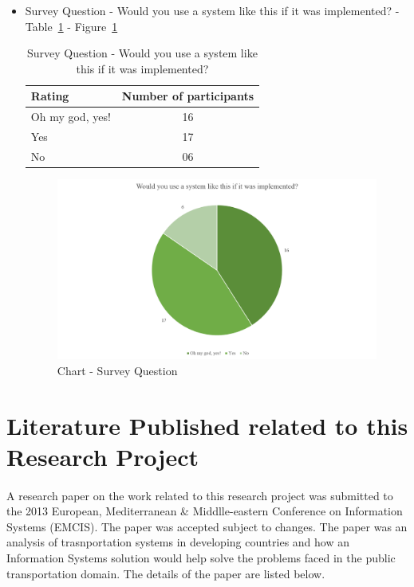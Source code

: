 \begin {itemize}
\item Survey Question - Would you use a system like this if it was implemented? - Table~\ref{table-survey-question-WouldYouUseASystemLikeThis} - Figure~\ref{image-questionWouldYouUse}

\begin{table} [H]
\centering
\begin{tabular}{|l|c|}
\hline
Rating & Number of participants \\
\hline
Oh my god, yes!	&16 \\
Yes	&17 \\
No	&06 \\
\hline
\end{tabular}
\caption{Survey Question - Would you use a system like this if it was implemented?}
\label{table-survey-question-WouldYouUseASystemLikeThis}
\end{table}

\begin {figure} [H]
\centering
\includegraphics [scale=0.7] {questionWouldYouUse}
\caption [Chart - Survey Question] {Chart - Survey Question}
\label {image-questionWouldYouUse}
\end {figure}

\end {itemize}



\section{Literature Published related to this Research Project}

\paragraph{} A research paper on the work related to this research project was submitted to the 2013 European, Mediterranean \& Middlle-eastern Conference on Information Systems (EMCIS). The paper was accepted subject to changes. The paper was an analysis of trasnportation systems in developing countries and how an Information Systems solution would help solve the problems faced in the public transportation domain. The details of the paper are listed below.

